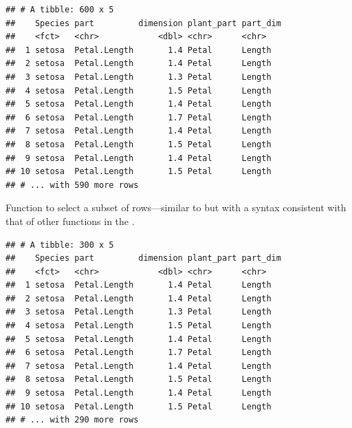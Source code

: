 \documentclass[krantz2]{krantz}\usepackage{knitr}%
\begin{document}
\begin{knitrout}\footnotesize
{}\color{fgcolor}\begin{kframe}
\begin{alltt}
\end{alltt}
\begin{verbatim}
## # A tibble: 600 x 5
##    Species part         dimension plant_part part_dim
##    <fct>   <chr>            <dbl> <chr>      <chr>   
##  1 setosa  Petal.Length       1.4 Petal      Length  
##  2 setosa  Petal.Length       1.4 Petal      Length  
##  3 setosa  Petal.Length       1.3 Petal      Length  
##  4 setosa  Petal.Length       1.5 Petal      Length  
##  5 setosa  Petal.Length       1.4 Petal      Length  
##  6 setosa  Petal.Length       1.7 Petal      Length  
##  7 setosa  Petal.Length       1.4 Petal      Length  
##  8 setosa  Petal.Length       1.5 Petal      Length  
##  9 setosa  Petal.Length       1.4 Petal      Length  
## 10 setosa  Petal.Length       1.5 Petal      Length  
## # ... with 590 more rows
\end{verbatim}
\end{kframe}
\end{knitrout}

Function  to select a subset of rows---similar to  but with a syntax consistent with that of other functions in the .

\begin{knitrout}\footnotesize
{}\color{fgcolor}\begin{kframe}
\begin{alltt}
 \hlopt{==} \hlstd{)}
\end{alltt}
\begin{verbatim}
## # A tibble: 300 x 5
##    Species part         dimension plant_part part_dim
##    <fct>   <chr>            <dbl> <chr>      <chr>   
##  1 setosa  Petal.Length       1.4 Petal      Length  
##  2 setosa  Petal.Length       1.4 Petal      Length  
##  3 setosa  Petal.Length       1.3 Petal      Length  
##  4 setosa  Petal.Length       1.5 Petal      Length  
##  5 setosa  Petal.Length       1.4 Petal      Length  
##  6 setosa  Petal.Length       1.7 Petal      Length  
##  7 setosa  Petal.Length       1.4 Petal      Length  
##  8 setosa  Petal.Length       1.5 Petal      Length  
##  9 setosa  Petal.Length       1.4 Petal      Length  
## 10 setosa  Petal.Length       1.5 Petal      Length  
## # ... with 290 more rows
\end{verbatim}
\end{kframe}
\end{knitrout}
\end{document}
